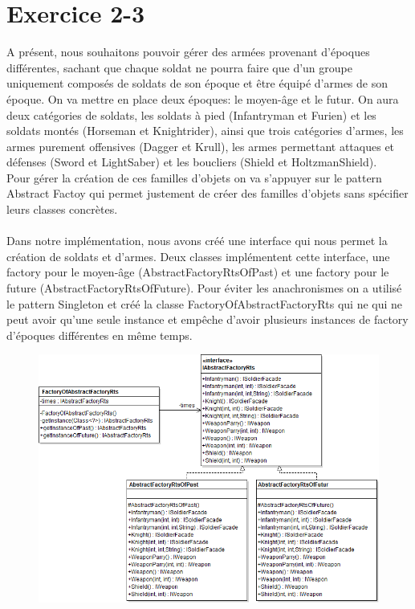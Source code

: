 \documentclass[%
a4paper,
11pt
]{article}
\begin{document}
\newpage
\section*{Exercice 2-3}
A présent, nous souhaitons pouvoir gérer des armées provenant d'époques différentes, sachant que chaque soldat ne pourra faire que d'un groupe uniquement composés de soldats de son époque et être équipé d'armes de son époque. On va mettre en place deux époques: le moyen-âge et le futur. On aura deux catégories de soldats, les soldats à pied (Infantryman et Furien) et les soldats montés (Horseman et Knightrider), ainsi que trois catégories d'armes, les armes purement offensives (Dagger et Krull), les armes permettant attaques et défenses (Sword et LightSaber) et les boucliers (Shield et HoltzmanShield).\\
Pour gérer la création de ces familles d'objets on va s'appuyer sur le pattern Abstract Factoy qui permet justement de créer des familles d'objets sans spécifier leurs classes concrètes.\\
\\
Dans notre implémentation, nous avons créé une interface qui nous permet la création de soldats et d'armes. Deux classes implémentent cette interface, une factory pour le moyen-âge (AbstractFactoryRtsOfPast) et une factory pour le future (AbstractFactoryRtsOfFuture). Pour éviter les anachronismes on a utilisé le pattern Singleton et créé la classe FactoryOfAbstractFactoryRts qui ne qui ne peut avoir qu'une seule instance et empêche d'avoir plusieurs instances de factory d'époques différentes en même temps.

\begin{figure}[!ht]
    \center
    \includegraphics[width =13cm]{imgs/abstractfactory.png}
\end{figure}
 
\end{document}

